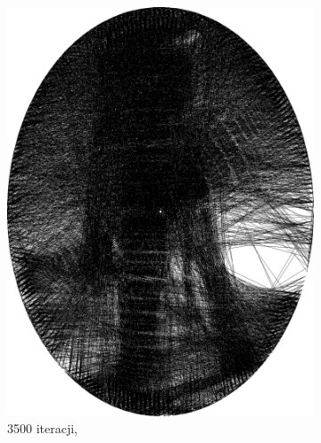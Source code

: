 \begin{figure}[htb]
\begin{subfigure}{0.19\textwidth}
            \includegraphics[width = \textwidth]{img/2-theory/aldrin/010mask-aldrin_ellipse_3500_threaded.png}
            \caption{3500 iteracji, }
            \label{theory-technics-mask-aldrin-threaded-j}
        \end{subfigure}
        \begin{subfigure}{0.19\textwidth}
            \centering

\end{subfigure}
\end{figure}
